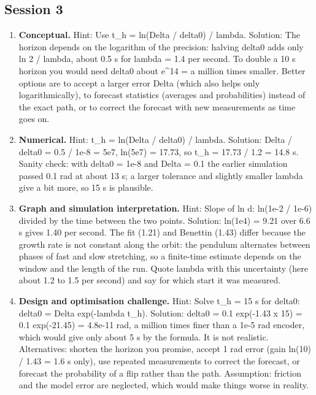 \documentclass[11pt,a4paper]{article}
\begin{document}
\subsection*{Session 3}
\begin{enumerate}[nosep]
\item \textbf{Conceptual.} Hint: Use t\_h = ln(Delta / delta0) / lambda. Solution: The horizon depends on the logarithm of the precision: halving delta0 adds only ln 2 / lambda, about 0.5 s for lambda = 1.4 per second. To double a 10 s horizon you would need delta0 about e\textasciicircum{}14 = a million times smaller. Better options are to accept a larger error Delta (which also helps only logarithmically), to forecast statistics (averages and probabilities) instead of the exact path, or to correct the forecast with new measurements as time goes on.
\item \textbf{Numerical.} Hint: t\_h = ln(Delta / delta0) / lambda. Solution: Delta / delta0 = 0.5 / 1e-8 = 5e7, ln(5e7) = 17.73, so t\_h = 17.73 / 1.2 = 14.8 s. Sanity check: with delta0 = 1e-8 and Delta = 0.1 the earlier simulation passed 0.1 rad at about 13 s; a larger tolerance and slightly smaller lambda give a bit more, so 15 s is plausible.
\item \textbf{Graph and simulation interpretation.} Hint: Slope of ln d: ln(1e-2 / 1e-6) divided by the time between the two points. Solution: ln(1e4) = 9.21 over 6.6 s gives 1.40 per second. The fit (1.21) and Benettin (1.43) differ because the growth rate is not constant along the orbit: the pendulum alternates between phases of fast and slow stretching, so a finite-time estimate depends on the window and the length of the run. Quote lambda with this uncertainty (here about 1.2 to 1.5 per second) and say for which start it was measured.
\item \textbf{Design and optimisation challenge.} Hint: Solve t\_h = 15 s for delta0: delta0 = Delta exp(-lambda t\_h). Solution: delta0 = 0.1 exp(-1.43 x 15) = 0.1 exp(-21.45) = 4.8e-11 rad, a million times finer than a 1e-5 rad encoder, which would give only about 5 s by the formula. It is not realistic. Alternatives: shorten the horizon you promise, accept 1 rad error (gain ln(10) / 1.43 = 1.6 s only), use repeated measurements to correct the forecast, or forecast the probability of a flip rather than the path. Assumption: friction and the model error are neglected, which would make things worse in reality.
\end{enumerate}
\end{document}
